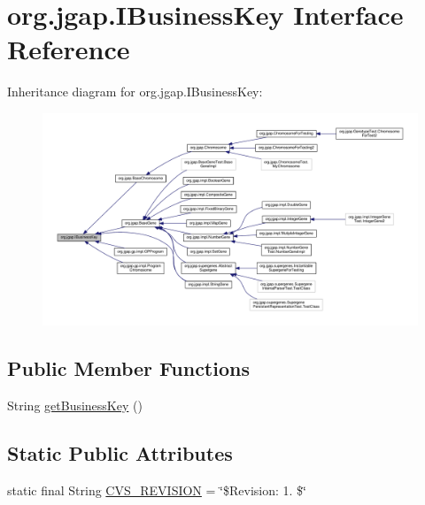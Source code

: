 \hypertarget{interfaceorg_1_1jgap_1_1_i_business_key}{\section{org.\-jgap.\-I\-Business\-Key Interface Reference}
\label{interfaceorg_1_1jgap_1_1_i_business_key}
}


Inheritance diagram for org.\-jgap.\-I\-Business\-Key\-:
\nopagebreak
\begin{figure}[H]
\begin{center}
\leavevmode
\includegraphics[width=350pt]{interfaceorg_1_1jgap_1_1_i_business_key__inherit__graph}
\end{center}
\end{figure}
\subsection*{Public Member Functions}
\begin{DoxyCompactItemize}
\item 
String \hyperlink{interfaceorg_1_1jgap_1_1_i_business_key_ab1b12087d8726e9020441a1fed6be0f8}{get\-Business\-Key} ()
\end{DoxyCompactItemize}
\subsection*{Static Public Attributes}
\begin{DoxyCompactItemize}
\item 
static final String \hyperlink{interfaceorg_1_1jgap_1_1_i_business_key_a6d43b687da0842739b8021f466ca451a}{C\-V\-S\-\_\-\-R\-E\-V\-I\-S\-I\-O\-N} = \char`\"{}\$Revision\-: 1. \$\char`\"{}
\end{DoxyCompactItemize}


